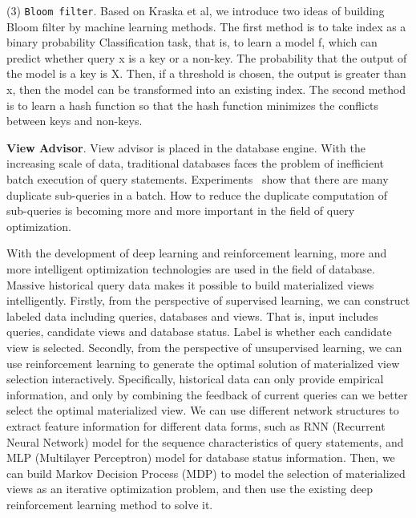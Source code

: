 (3) \texttt{Bloom filter}. Based on Kraska et al, we introduce two ideas of building Bloom filter by machine learning methods. 
The first method is to take index as a binary probability Classification task, that is, to learn a model f, which can predict whether query x is a key or a non-key. The probability that the output of the model is a key is X. Then, if a threshold is chosen, the output is greater than x, then the model can be transformed into an existing index. 
The second method is to learn a hash function so that the hash function minimizes the conflicts between keys and non-keys.

\noindent \textbf{View Advisor}. View advisor is placed in the database engine. With the increasing scale of data, traditional databases faces the problem of inefficient batch execution of query statements. Experiments~\cite{DBLP:journals/pvldb/JindalKRP18, DBLP:conf/sigmod/JindalQPYDBFLKR18} show that there are many duplicate sub-queries in a batch. How to reduce the duplicate computation of sub-queries is becoming more and more important in the field of query optimization.

With the development of deep learning and reinforcement learning, more and more intelligent optimization technologies are used in the field of database. 
Massive historical query data makes it possible to build materialized views intelligently. 
Firstly, from the perspective of supervised learning, we can construct labeled data including queries, databases and views. That is, input includes queries, candidate views and database status. Label is whether each candidate view is selected. 
Secondly, from the perspective of unsupervised learning, we can use reinforcement learning to generate the optimal solution of materialized view selection interactively. Specifically, historical data can only provide empirical information, and only by combining the feedback of current queries can we better select the optimal materialized view. 
We can use different network structures to extract feature information for different data forms, such as RNN (Recurrent Neural Network) model for the sequence characteristics of query statements, and MLP (Multilayer Perceptron) model for database status information. Then, we can build Markov Decision Process (MDP) to model the selection of materialized views as an iterative optimization problem, and then use the existing deep reinforcement learning method to solve it.

